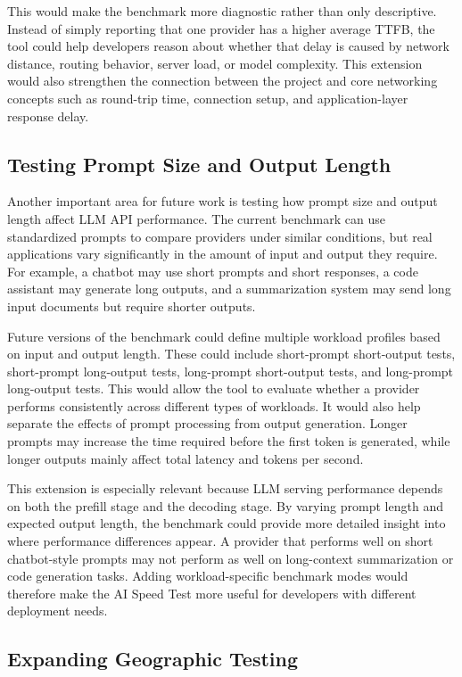 \documentclass[11pt, a4paper]{article}
\begin{document}
This would make the benchmark more diagnostic rather than only descriptive. Instead of simply reporting that one provider has a higher average TTFB, the tool could help developers reason about whether that delay is caused by network distance, routing behavior, server load, or model complexity. This extension would also strengthen the connection between the project and core networking concepts such as round-trip time, connection setup, and application-layer response delay.

\subsection{Testing Prompt Size and Output Length}

Another important area for future work is testing how prompt size and output length affect LLM API performance. The current benchmark can use standardized prompts to compare providers under similar conditions, but real applications vary significantly in the amount of input and output they require. For example, a chatbot may use short prompts and short responses, a code assistant may generate long outputs, and a summarization system may send long input documents but require shorter outputs.

Future versions of the benchmark could define multiple workload profiles based on input and output length. These could include short-prompt short-output tests, short-prompt long-output tests, long-prompt short-output tests, and long-prompt long-output tests. This would allow the tool to evaluate whether a provider performs consistently across different types of workloads. It would also help separate the effects of prompt processing from output generation. Longer prompts may increase the time required before the first token is generated, while longer outputs mainly affect total latency and tokens per second.

This extension is especially relevant because LLM serving performance depends on both the prefill stage and the decoding stage. By varying prompt length and expected output length, the benchmark could provide more detailed insight into where performance differences appear. A provider that performs well on short chatbot-style prompts may not perform as well on long-context summarization or code generation tasks. Adding workload-specific benchmark modes would therefore make the AI Speed Test more useful for developers with different deployment needs.

\subsection{Expanding Geographic Testing}
\end{document}
